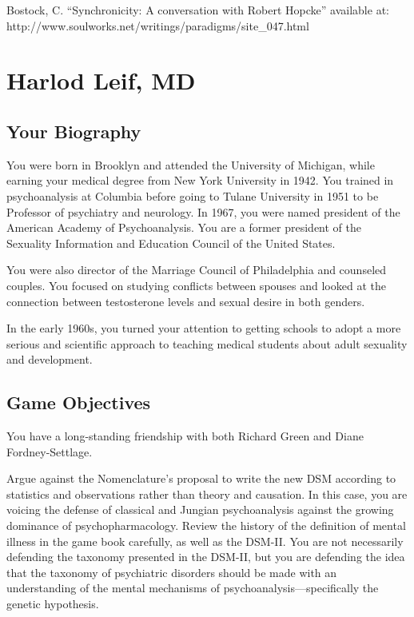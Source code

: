\begin{refsection}
Bostock, C. ``Synchronicity: A conversation with Robert Hopcke'' available at: http:\slash \slash www.soulworks.net\slash writings\slash paradigms\slash site\_047.html

\chapter{Harlod Leif, MD}
\label{harlodleifmd}

\section{Your Biography}
\label{yourbiography}

You were born in Brooklyn and attended the University of Michigan, while earning your medical degree from New York University in 1942. You trained in psychoanalysis at Columbia before going to Tulane University in 1951 to be Professor of psychiatry and neurology. In 1967, you were named president of the American Academy of Psychoanalysis. You are a former president of the Sexuality Information and Education Council of the United States.

You were also director of the Marriage Council of Philadelphia and counseled couples. You focused on studying conflicts between spouses and looked at the connection between testosterone levels and sexual desire in both genders.

In the early 1960s, you turned your attention to getting schools to adopt a more serious and scientific approach to teaching medical students about adult sexuality and development.

\section{Game Objectives}
\label{gameobjectives}

You have a long-standing friendship with both Richard Green and Diane Fordney-Settlage.

Argue against the Nomenclature's proposal to write the new DSM according to statistics and observations rather than theory and causation. In this case, you are voicing the defense of classical and Jungian psychoanalysis against the growing dominance of psychopharmacology. Review the history of the definition of mental illness in the game book carefully, as well as the DSM-II. You are not necessarily defending the taxonomy presented in the DSM-II, but you are defending the idea that the taxonomy of psychiatric disorders should be made with an understanding of the mental mechanisms of psychoanalysis---specifically the genetic hypothesis.


\end{refsection}
